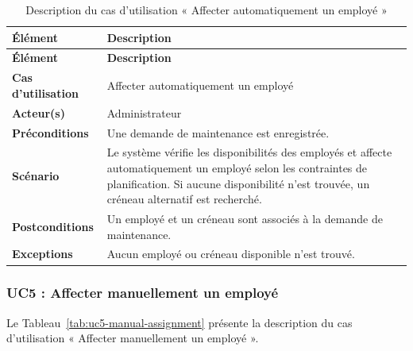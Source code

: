 \begin{longtable}{|>{\RaggedRight\arraybackslash}p{4cm}|>{\RaggedRight\arraybackslash}p{10.5cm}|}

\caption{Description du cas d'utilisation « Affecter automatiquement un employé »}
\label{tab:uc4-assignment}\\

\hline
\textbf{Élément} & \textbf{Description} \\
\hline
\endfirsthead

\hline
\textbf{Élément} & \textbf{Description} \\
\hline
\endhead

\textbf{Cas d'utilisation} &
Affecter automatiquement un employé \\
\hline

\textbf{Acteur(s)} &
Administrateur \\
\hline

\textbf{Préconditions} &
Une demande de maintenance est enregistrée. \\
\hline

\textbf{Scénario} &
Le système vérifie les disponibilités des employés et affecte automatiquement un employé selon les contraintes de planification. Si aucune disponibilité n'est trouvée, un créneau alternatif est recherché. \\
\hline

\textbf{Postconditions} &
Un employé et un créneau sont associés à la demande de maintenance. \\
\hline

\textbf{Exceptions} &
Aucun employé ou créneau disponible n'est trouvé. \\
\hline

\end{longtable}


\subsubsection{UC5 : Affecter manuellement un employé}

Le Tableau~\ref{tab:uc5-manual-assignment} présente la description du cas d'utilisation « Affecter manuellement un employé ».

